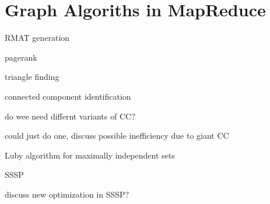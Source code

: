 \section{Graph Algoriths in MapReduce}
\label{sec:graph}

RMAT generation

pagerank

triangle finding

connected component identification

do wee need differnt variants of CC?

could just do one, discuss possible inefficiency due to giant CC

Luby algorithm for maximally independent sets

SSSP

discuss new optimization in SSSP?
